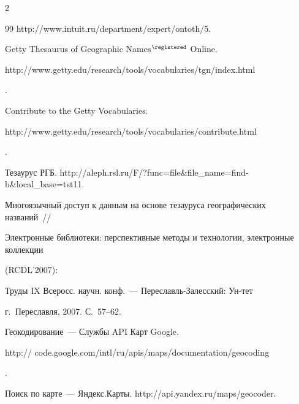 \begin{multicols}{2}
{{\begin{thebibliography}{99}
{http://\linebreak www.intuit.ru/department/expert/ontoth/5}.




Getty Thesaurus of Geographic Names$^\registered$ Online. {\sf 

http://\linebreak www.getty.edu/research/tools/vocabularies/tgn/index.\linebreak html}.




Contribute to the Getty Vocabularies. {\sf 

http://www.\linebreak getty.edu/research/tools/vocabularies/contribute.html}.




Тезаурус РГБ. {\sf http://aleph.rsl.ru/F/?func=file\&file\_\linebreak name=find-b\&local\_base=tst11}.





Многоязычный доступ к данным на основе тезауруса географических названий~// 

Электронные библиотеки: перспективные методы и технологии, электронные коллекции 

(RCDL'2007):\linebreak

 Труды IX Всеросс. научн. конф.~--- Пе\-ре\-славль-За\-лес\-ский: Ун-тет 

г.~Переславля, 2007. С.~57--62.




Геокодирование~--- Службы API Карт Google. {\sf 

http:// code.google.com/intl/ru/apis/maps/documentation/\linebreak geocoding}.




Поиск по карте~--- Яндекс.Карты. {\sf http://api.\linebreak yandex.ru/maps/geocoder}.






\end{thebibliography}}}
\end{multicols}
